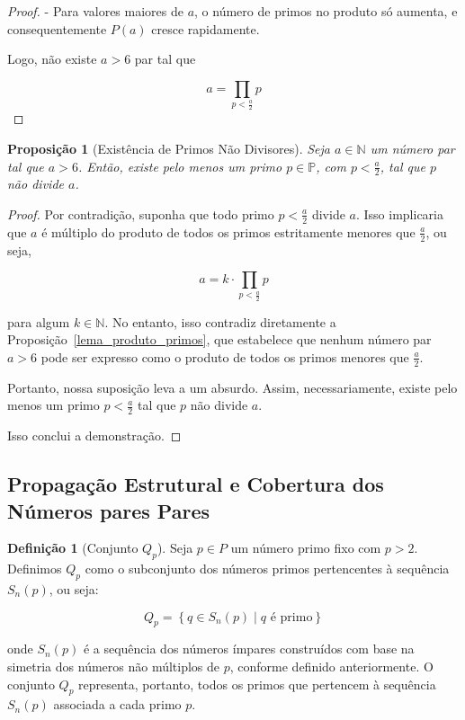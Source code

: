 \documentclass[a4paper,11pt]{article}
\newtheorem{proposition}[theorem]{Proposição}
\theoremstyle{definition}
\newtheorem{definition}[theorem]{Definição}
\theoremstyle{remark}
\begin{document}
\begin{otherlanguage}{brazil}
\begin{proof}
		- Para valores maiores de \(a\), o número de primos no produto só aumenta, e consequentemente \(P(a)\) cresce rapidamente.
		
		Logo, não existe \(a > 6\) par tal que
		
		\[
		a = \prod_{p < \frac{a}{2}} p
		\]
		
	\end{proof}
	
	\begin{proposition}[Existência de Primos Não Divisores]
		Seja \(a \in \mathbb{N}\) um número par tal que \(a > 6\). Então, existe pelo menos um primo \(p \in \mathbb{P}\), com \(p < \frac{a}{2}\), tal que \(p\) não divide \(a\).
	\end{proposition}
	
	\begin{proof}
		Por contradição, suponha que todo primo \(p < \frac{a}{2}\) divide \(a\). Isso implicaria que \(a\) é múltiplo do produto de todos os primos estritamente menores que \(\frac{a}{2}\), ou seja,
		
		\[
		a = k \cdot \prod_{p < \frac{a}{2}} p
		\]
		
		para algum \(k \in \mathbb{N}\). No entanto, isso contradiz diretamente a Proposição~\ref{lema_produto_primos}, que estabelece que nenhum número par \(a > 6\) pode ser expresso como o produto de todos os primos menores que \(\frac{a}{2}\).
		
		Portanto, nossa suposição leva a um absurdo. Assim, necessariamente, existe pelo menos um primo \(p < \frac{a}{2}\) tal que \(p\) não divide \(a\).
		
		Isso conclui a demonstração.
	\end{proof}
	
	\subsection{Propagação Estrutural e Cobertura dos Números pares Pares}
	\begin{definition}[Conjunto \(Q_p\)]
		Seja \(p \in P\) um número primo fixo com \(p > 2\). Definimos \(Q_p\) como o subconjunto dos números primos pertencentes à sequência \(S_n(p)\), ou seja:
		
		\[
		Q_p = \left\{ q \in S_n(p) \mid q \text{ é primo} \right\}
		\]
		
		onde \(S_n(p)\) é a sequência dos números ímpares construídos com base na simetria dos números não múltiplos de \(p\), conforme definido anteriormente. O conjunto \(Q_p\) representa, portanto, todos os primos que pertencem à sequência \(S_n(p)\) associada a cada primo \(p\).
	\end{definition}
	

\end{otherlanguage}
\end{document}
